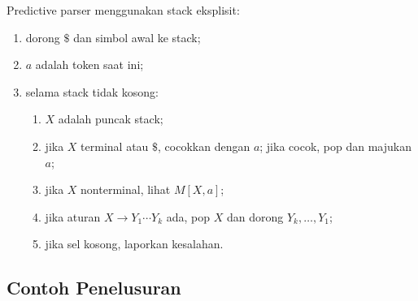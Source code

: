 Predictive parser menggunakan stack eksplisit:
\begin{enumerate}[label=\arabic*.,leftmargin=*]
  \item dorong \(\$\) dan simbol awal ke stack;
  \item \(a\) adalah token saat ini;
  \item selama stack tidak kosong:
        \begin{enumerate}[label=(\alph*),leftmargin=*]
          \item \(X\) adalah puncak stack;
          \item jika \(X\) terminal atau \(\$\), cocokkan dengan
                \(a\); jika cocok, pop dan majukan \(a\);
          \item jika \(X\) nonterminal, lihat \(M[X,a]\);
          \item jika aturan \(X \to Y_1\cdots Y_k\) ada, pop \(X\)
                dan dorong \(Y_k,\ldots,Y_1\);
          \item jika sel kosong, laporkan kesalahan.
        \end{enumerate}
\end{enumerate}

\subsection{Contoh Penelusuran}

